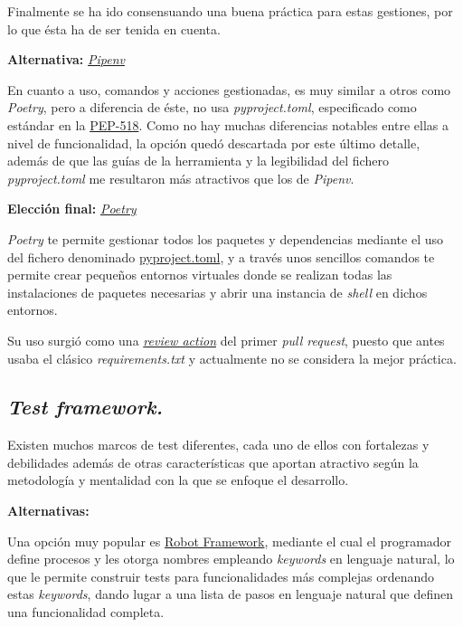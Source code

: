 Finalmente se ha ido consensuando una buena práctica para estas gestiones, por lo que ésta ha de ser tenida en cuenta.

\textbf{Alternativa:} \href{https://pipenv-es.readthedocs.io/es/latest/}{\textit{Pipenv}}

En cuanto a uso, comandos y acciones gestionadas, es muy similar a otros como \textit{Poetry}, pero a diferencia de éste, no usa \textit{pyproject.toml}, especificado como estándar en la \href{https://peps.python.org/pep-0518/}{PEP-518}. Como no hay muchas diferencias notables entre ellas a nivel de funcionalidad, la opción quedó descartada por este último detalle, además de que las guías de la herramienta y la legibilidad del fichero \textit{pyproject.toml} me resultaron más atractivos que los de \textit{Pipenv}.

\textbf{Elección final:} \href{https://python-poetry.org/}{\textit{Poetry}}

\textit{Poetry} te permite gestionar todos los paquetes y dependencias mediante el uso del fichero denominado \href{https://github.com/Anglepi/My-Many-Reads/blob/main/pyproject.toml}{pyproject.toml}, y a través unos sencillos comandos te permite crear pequeños entornos virtuales donde se realizan todas las instalaciones de paquetes necesarias y abrir una instancia de \textit{shell} en dichos entornos.

Su uso surgió como una \href{https://github.com/Anglepi/My-Many-Reads/pull/39#discussion_r974230463}{\textit{review action}} del primer \textit{pull request}, puesto que antes usaba el clásico \textit{requirements.txt} y actualmente no se considera la mejor práctica.

\subsection{\textit{Test framework.}}

Existen muchos marcos de test diferentes, cada uno de ellos con fortalezas y debilidades además de otras características que aportan atractivo según la metodología y mentalidad con la que se enfoque el desarrollo.

\textbf{Alternativas:}

Una opción muy popular es \href{https://robotframework.org/}{Robot Framework}, mediante el cual el programador define procesos y les otorga nombres empleando \textit{keywords} en lenguaje natural, lo que le permite construir tests para funcionalidades más complejas ordenando estas \textit{keywords}, dando lugar a una lista de pasos en lenguaje natural que definen una funcionalidad completa.

